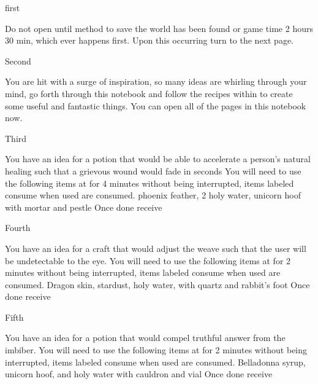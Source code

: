 \documentclass[greennotebook]{guildcamp3} %
\begin{document}
\startnotebook{\nMagTwoRecipes{}}

\begin{page}{first}
	
	Do not open until method to save the world has been found or game time 2 hours 30 min, which ever happens first. Upon this occurring turn to the next page.
	
\end{page}

\begin{page}{Second}
	
	You are hit with a surge of inspiration, so many ideas are whirling through your mind, go forth through this notebook and follow the recipes within to create some useful and fantastic things. You can open all of the pages in this notebook now.
	
\end{page}

\begin{page}{Third}
	
	You have an idea for a potion that would be able to accelerate a person's natural healing such that a grievous wound would fade in seconds
	You will need to use the following items at \sMageWorkbench{} for 4 minutes without being interrupted, items labeled consume when used are consumed.
	phoenix feather, 2 holy water, unicorn hoof with mortar and pestle
	Once done receive \iHealthRemedy{}
	
\end{page}

\begin{page}{Fourth}
	
	You have an idea for a craft that would adjust the weave such that the user will be undetectable to the eye.
	You will need to use the following items at\sMageWorkbench{} for 2 minutes without being interrupted, items labeled consume when used are consumed.
	Dragon skin, stardust, holy water, with quartz and rabbit's foot
	Once done receive \iInvisibilityCloak{}
	
\end{page}

\begin{page}{Fifth}
	
	You have an idea for a potion that would compel truthful answer from the imbiber.
	You will need to use the following items at \sMageWorkbench{} for 2 minutes without being interrupted, items labeled consume when used are consumed.
	Belladonna syrup, unicorn hoof, and holy water with cauldron and vial
	Once done receive \iTruthPotion{}
	
\end{page}
\end{document}
